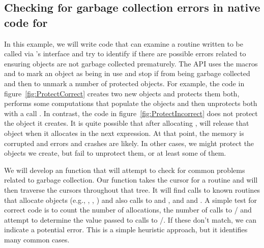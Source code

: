 \subsection[Checking for garbage collection errors in native code for R]{Checking for garbage collection errors in native code for \R{}}\label{sec:ProtectEG}
In this example, we will write code that can examine a \C{} routine
written to be called via \R's  interface and try to
identify if there are possible errors related to ensuring \R{} objects
are not garbage collected prematurely.  The \R{} API uses the macros
 and  to mark an object as being in
use and stop if from being garbage collected and then to unmark a number of
protected objects.  For example, the \C{} code in
figure~\ref{fig:ProtectCorrect} creates two new \R{} objects and
protects them both, performs some computations that populate the
objects and then unprotects both with a call .  In
contrast, the code in figure~\ref{fig:ProtectIncorrect} does not
protect the \R{} object it creates.  It is quite possible that after
allocating , \R{} will release that object when it allocates
 in the next expression. At that point, the memory is
corrupted and errors and crashes are likely.
In other cases, we might protect the \R{} objects we create,
but fail to unprotect them, or at least some of them.



We will develop an \R{} function that will attempt to check for common
problems related to garbage collection.  Our function takes the
\libclang{} cursor for a routine and will then traverse the cursors
throughout that tree. It will find calls to known routines that
allocate \R{} objects (e.g., ,
, ) and also calls to
 and , and  and
.  A simple test for correct code is to count the
number of allocations, the number of calls to
/ and attempt to determine the value
passed to calls to /.  If these
don't match, we can indicate a potential error.  This is a simple
heuristic approach, but it identifies many common cases.

\begin{comment}
What about \Cfunc{NEW_NUMERIC}, \Cfunc{PROTECT} and \Cfunc{UNPROTECT}?
In some cases, these are acutally pre-processor macros and in others
they are routines. They expand to
\Cexpr{Rf_allocVector(REALSXP, n)} and calls to \Cfunc{Rf_protect} and
\Cfunc{Rf_unprotect}.  We can find these expansions and substitutions
in the translation unit. Alternatively, we can use our knowledge of
how the \R{} API works.
\end{comment}

